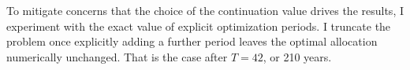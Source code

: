 To mitigate concerns that the choice of the continuation value drives the results, I experiment with the exact value of explicit optimization periods. I truncate the problem once explicitly adding a further period leaves the optimal allocation numerically unchanged. That is the case after $T=42$, or 210 years. %





